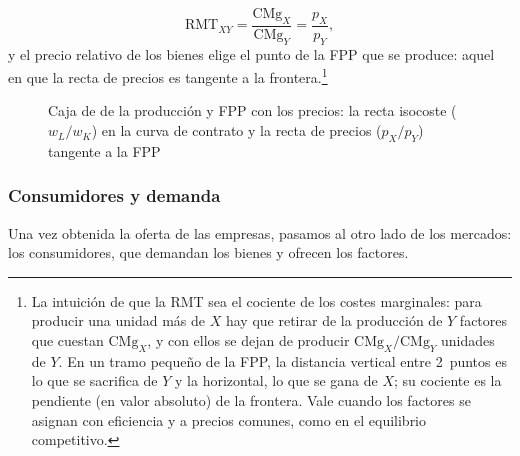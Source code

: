 \documentclass[11pt]{article}
\begin{document}
\begin{itemize}
\begin{itemize}
    \begin{equation}
    \mathrm{RMT}_{XY}=\frac{\mathrm{CMg}_X}{\mathrm{CMg}_Y}=\frac{p_X}{p_Y}, \label{eq:rmt-precios}
    \end{equation}
    y el precio relativo de los bienes elige el punto de la FPP que se produce: aquel en que la recta de precios es tangente a la frontera.\footnote{La intuición de que la RMT sea el cociente de los costes marginales: para producir una unidad más de $X$ hay que retirar de la producción de $Y$ factores que cuestan $\mathrm{CMg}_X$, y con ellos se dejan de producir $\mathrm{CMg}_X/\mathrm{CMg}_Y$ unidades de $Y$. En un tramo pequeño de la FPP, la distancia vertical entre 2~puntos es lo que se sacrifica de $Y$ y la horizontal, lo que se gana de $X$; su cociente es la pendiente (en valor absoluto) de la frontera. Vale cuando los factores se asignan con eficiencia y a precios comunes, como en el equilibrio competitivo.}
  \end{itemize}
\end{itemize}

\begin{figure}[H]
\centering
\caption{Caja de  de la producción y FPP con los precios: la recta isocoste ($w_L/w_K$) en la curva de contrato y la recta de precios ($p_X/p_Y$) tangente a la FPP}\label{fig:caja-produccion-precios}
\end{figure}

\subsubsection{Consumidores y demanda}\label{sec:consumidores-demanda}

Una vez obtenida la oferta de las empresas, pasamos al otro lado de los mercados: los consumidores, que demandan los bienes y ofrecen los factores.
\end{document}
